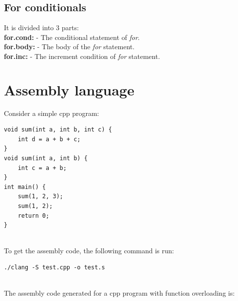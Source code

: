 \documentclass{article}
\begin{document}
\subsection{For conditionals}
It is divided into 3 parts: \\
\textbf{for.cond:} - The conditional statement of \textit{for}.\\
\textbf{for.body:} - The body of the \textit{for} statement.\\
\textbf{for.inc:} - The increment condition of \textit{for} statement.

\section{Assembly language}
Consider a simple cpp program:

\begin{verbatim}
void sum(int a, int b, int c) {
    int d = a + b + c;
}
void sum(int a, int b) {
    int c = a + b;
}
int main() {
    sum(1, 2, 3);
    sum(1, 2);
    return 0;
}
\end{verbatim}
\\
To get the assembly code, the following command is run:
\begin{verbatim}
./clang -S test.cpp -o test.s
\end{verbatim}
\\
The assembly code generated for a cpp program with function overloading is: 
\end{document}
